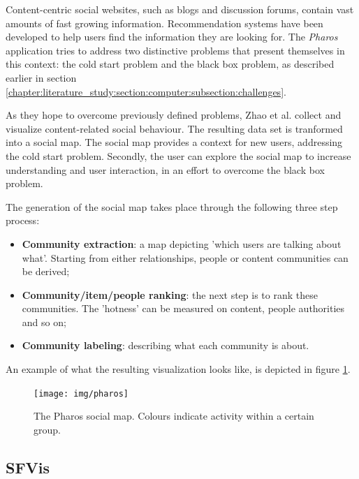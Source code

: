 Content-centric social websites, such as blogs and discussion forums, contain vast amounts of fast growing information. Recommendation systems have been developed to help users find the information they are looking for. The \emph{Pharos} application tries to address two distinctive problems that present themselves in this context: the cold start problem and the black box problem\cite{zhao:2010}, as described earlier in section \ref{chapter:literature_study:section:computer:subsection:challenges}.

As they hope to overcome previously defined problems, Zhao et al. \cite{zhao:2010} collect and visualize content-related social behaviour. The resulting data set is tranformed into a social map. The social map provides a context for new users, addressing the cold start problem. Secondly, the user can explore the social map to increase understanding and user interaction, in an effort to overcome the black box problem.

The generation of the social map takes place through the following three step process:

\begin{itemize}
	\item \textbf{Community extraction}: a map depicting 'which users are talking about what'. Starting from either relationships, people or content communities can be derived;
	\item \textbf{Community/item/people ranking}: the next step is to rank these communities. The 'hotness' can be measured on content, people authorities and so on;
	\item \textbf{Community labeling}: describing what each community is about.
\end{itemize}

An example of what the resulting visualization looks like, is depicted in figure \ref{figure:pharos}.

\begin{figure}%
	\begin{center}
		\texttt{[image: img/pharos]}%
	\end{center}
	\caption{The Pharos social map. Colours indicate activity within a certain group.}%
	\label{figure:pharos}%
\end{figure}




\subsection{SFVis}\label{chapter:survey:section:applications:subsection:sfvis}

